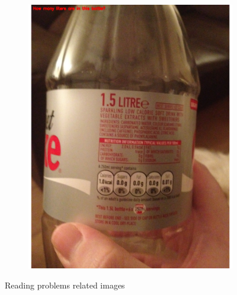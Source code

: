 \documentclass[sigconf]{acmart}
\begin{document}
\begin{figure}[hbp]
\begin{subfigure}[b]{0.3\columnwidth}
                \includegraphics[width=\textwidth]{images/reading_3.pdf}  
        \end{subfigure}%
       
        \caption{Reading problems related images} 
        \label{fig:reading}
\end{figure}
\end{document}
